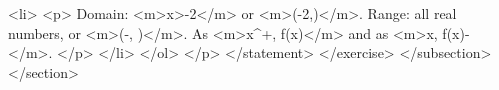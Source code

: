                         <li>
                            <p>
                                Domain: <m>x>-2</m> or <m>(-2,\infty)</m>.
                                Range: all real numbers, or <m>(-\infty, \infty)</m>.
                                As <m>x^{+}, f(x)\to \infty</m> and as <m>x\to\infty, f(x)\to-\infty</m>.
                            </p>
                        </li>
                    </ol>
                </p>
            </statement>
        </exercise>
    </subsection>
</section>